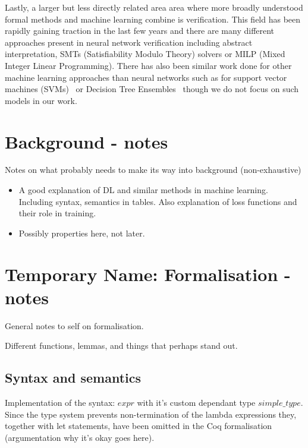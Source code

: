 \documentclass[a4paper,UKenglish,cleveref, autoref, thm-restate]{lipics-v2021}
\begin{document}
Lastly, a larger but less directly related area area where more broadly understood formal methods and machine learning combine is verification. This field has been rapidly gaining traction in the last few years and there are many different approaches present in neural network verification\cite{urban2021review,9842406,easterbrook1998formal} including abstract interpretation, SMTs (Satisfiability Modulo Theory) \cite{katz2019marabou} solvers or MILP (Mixed Integer Linear Programming). There has also been similar work done for other machine learning approaches than neural networks such as for support vector machines (SVMs)~\cite{ranzato2019robustness} or Decision Tree Ensembles~\cite{einziger2019verifying} though we do not focus on such models in our work. 




\section{Background - notes}


Notes on what probably needs to make its way into background (non-exhaustive)
\begin{itemize}
	\item A good explanation of DL and similar methods in machine learning. Including syntax, semantics in tables. Also explanation of loss functions and their role in training.
	\item Possibly properties here, not later.
\end{itemize}






\section{Temporary Name: Formalisation - notes}

General notes to self on formalisation.

Different functions, lemmas, and things that perhaps stand out.

\subsection{Syntax and semantics}

Implementation of the syntax: $expr$ with it's custom dependant type $simple\_type$. Since the type system prevents non-termination of the lambda expressions they, together with let statements, have been omitted in the Coq formalisation (argumentation why it's okay goes here).
\end{document}
